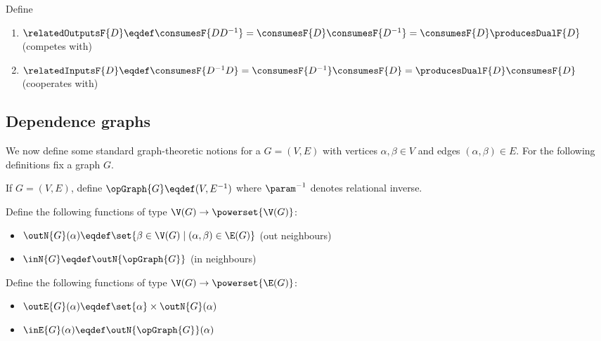 \begin{definition}
   Define
   \begin{enumerate}
      \item $\relatedOutputsF{D} \eqdef \consumesF{DD^{-1}} = \consumesF{D}\consumesF{D^{-1}} = \consumesF{D}\producesDualF{D}$ \hfill (competes with)
      \item $\relatedInputsF{D} \eqdef \consumesF{D^{-1}D} = \consumesF{D^{-1}}\consumesF{D} = \producesDualF{D}\consumesF{D}$ \hfill (cooperates with)
   \end{enumerate}
\end{definition}

\subsection{Dependence graphs}

We now define some standard graph-theoretic notions for a $G = (V, E)$ with vertices $\alpha, \beta \in V$ and
edges $(\alpha, \beta) \in E$. For the following definitions fix a graph $G$.

\begin{definition}
   If $G = (V,E)$, define $\opGraph{G} \eqdef (V, E^{-1})$ where $\param^{-1}$ denotes relational inverse.
\end{definition}

\begin{definition}[Neighbours]
   Define the following functions of type $\V(G) \to \powerset{\V(G)}$:
   \begin{itemize}
      \item $\outN{G}(\alpha) \eqdef \set{\beta \in \V(G) \mid (\alpha, \beta) \in \E(G)}$ \hfill (out neighbours)
      \item $\inN{G} \eqdef \outN{\opGraph{G}}$ \hfill (in neighbours)
   \end{itemize}
\end{definition}

\begin{definition}[Edges]
   Define the following functions of type $\V(G) \to \powerset{\E(G)}$:
   \begin{itemize}
      \item $\outE{G}(\alpha) \eqdef \set{\alpha} \times \outN{G}(\alpha)$
      \item $\inE{G}(\alpha) \eqdef \outN{\opGraph{G}}(\alpha)$
   \end{itemize}
\end{definition}

